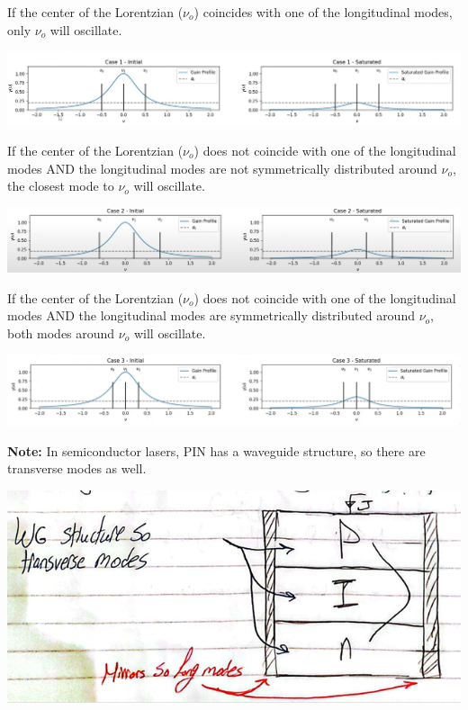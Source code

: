 \documentclass[11pt]{article}
\begin{document}
If the center of the Lorentzian ($\nu_o$) coincides with one of the longitudinal modes, only $\nu_o$ will oscillate. 
\begin{center}
    \includegraphics[scale=0.55]{1.png}
\end{center}
If the center of the Lorentzian ($\nu_o$) does not coincide with one of the longitudinal modes AND the longitudinal modes are not symmetrically distributed around $\nu_o$, the closest mode to $\nu_o$ will oscillate.
\begin{center}
    \includegraphics[scale=0.55]{2.png}
\end{center}
If the center of the Lorentzian ($\nu_o$) does not coincide with one of the longitudinal modes AND the longitudinal modes are symmetrically distributed around $\nu_o$, both modes around $\nu_o$ will oscillate.
\begin{center}
    \includegraphics[scale=0.55]{3.png}
\end{center}
\textbf{Note:} In semiconductor lasers, PIN has a waveguide structure, so there are transverse modes as well. 
\begin{center}
    \includegraphics[scale=0.55]{5.png}
\end{center}
\end{document}
